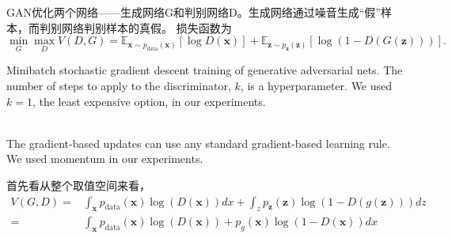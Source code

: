 \documentclass[a4paper]{article}
\begin{document}
GAN优化两个网络——生成网络G和判别网络D。生成网络通过噪音生成“假”样本，而判别网络判别样本的真假。
损失函数为
$$
\min_G \max_D V(D, G) = \mathbb{E}_{\bm{x} \sim p_{\text{data}}(\bm{x})}[\log D(\bm{x})] + \mathbb{E}_{\bm{z} \sim p_{\bm{z}}(\bm{z})}[\log (1 - D(G(\bm{z})))].
$$
\begin{algorithm}[ht]
\caption{\small Minibatch stochastic gradient descent training of generative adversarial nets.
The number of steps to apply to the discriminator, $k$, is a hyperparameter. We used $k=1$, the
least expensive option, in our experiments.
}
\begin{algorithmic}
\label{alg:AGF}
   \ENDFOR
  \ENDFOR
  \\The gradient-based updates can use any standard gradient-based learning rule. We used momentum in our experiments.
\end{algorithmic}
\end{algorithm}
首先看从整个取值空间来看，
\begin{align}
V(G, D) =& \int_{\bm{x}} p_\text{data}(\bm{x}) \log(D(\bm{x})) dx + \int_z p_{\bm{z}}(\bm{z}) \log(1 - D(g(\bm{z}))) dz \nonumber \\
		=& \int_{\bm{x}} p_\text{data}(\bm{x}) \log(D(\bm{x})) + p_g(\bm{x}) \log(1 - D(\bm{x})) dx
\end{align}
\end{document}
